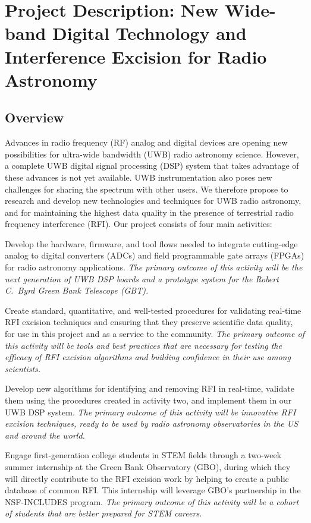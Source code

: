 \documentclass[10pt]{myNSF}
\begin{document}
\section{Project Description: New Wide-band Digital Technology and
  Interference Excision for Radio Astronomy}
\label{sec:project_description}

\subsection{Overview}
\label{sec:overview}

Advances in radio frequency (RF) analog and digital devices are
opening new possibilities for ultra-wide bandwidth (UWB) radio
astronomy science.  However, a complete UWB digital signal processing
(DSP) system that takes advantage of these advances is not yet
available.  UWB instrumentation also poses new challenges for sharing
the spectrum with other users.  We therefore propose to research and
develop new technologies and techniques for UWB radio astronomy, and
for maintaining the highest data quality in the presence of
terrestrial radio frequency interference (RFI).  Our project consists
of four main activities:
\vspace{-1em}
\begin{enumerate*}
\item{Develop the hardware, firmware, and tool flows needed to
  integrate cutting-edge analog to digital converters (ADCs) and field
  programmable gate arrays (FPGAs) for radio astronomy applications.
  \emph{The primary outcome of this activity will be the next
    generation of UWB DSP boards and a prototype system for the Robert
    C.\ Byrd Green Bank Telescope (GBT).}}
\item{Create standard, quantitative, and well-tested procedures for
  validating real-time RFI excision techniques and ensuring that they
  preserve scientific data quality, for use in this project and as a
  service to the community. \emph{The primary outcome of this activity
    will be tools and best practices that are necessary for testing
    the efficacy of RFI excision algorithms and building confidence in
    their use among scientists.}}
\item{Develop new algorithms for identifying and removing RFI in
  real-time, validate them using the procedures created in activity
  two, and implement them in our UWB DSP system.  \emph{The primary
    outcome of this activity will be innovative RFI excision
    techniques, ready to be used by radio astronomy observatories in
    the US and around the world.}}
\item{Engage first-generation college students in STEM fields through
  a two-week summer internship at the Green Bank Observatory (GBO),
  during which they will directly contribute to the RFI excision work
  by helping to create a public database of common RFI. This
  internship will leverage GBO's partnership in the NSF-INCLUDES
  program.  \emph{The primary outcome of this activity will be a
    cohort of students that are better prepared for STEM careers.}}
\end{enumerate*}
\end{document}
